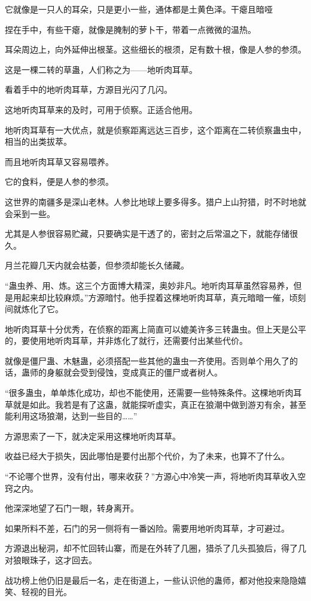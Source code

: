 \begin{this_body}
它就像是一只人的耳朵，只是更小一些，通体都是土黄色泽。干瘪且暗哑

捏在手中，有些干瘪，就像是腌制的萝卜干，带着一点微微的温热。

耳朵周边上，向外延伸出根茎。这些细长的根须，足有数十根，像是人参的参须。

这是一棵二转的草蛊，人们称之为——地听肉耳草。

看着手中的地听肉耳草，方源目光闪了几闪。

这地听肉耳草来的及时，可用于侦察。正适合他用。

地听肉耳草有一大优点，就是侦察距离远达三百步，这个距离在二转侦察蛊虫中，相当的出类拔萃。

而且地听肉耳草又容易喂养。

它的食料，便是人参的参须。

这世界的南疆多是深山老林。人参比地球上要多得多。猎户上山狩猎，时不时地就会采到一些。

尤其是人参很容易贮藏，只要确实是干透了的，密封之后常温之下，就能存储很久。

月兰花瓣几天内就会枯萎，但参须却能长久储藏。

“蛊虫养、用、炼。这三个方面博大精深，奥妙非凡。地听肉耳草虽然容易养，但是用起来却比较麻烦。”方源暗忖。他手捏着这棵地听肉耳草，真元暗暗一催，顷刻间就炼化了它。

地听肉耳草十分优秀，在侦察的距离上简直可以媲美许多三转蛊虫。但上天是公平的，要使用地听肉耳草，并非炼化了就行，还需要付出某些代价。

就像是僵尸蛊、木魅蛊，必须搭配一些其他的蛊虫一齐使用。否则单个用久了的话，蛊师的身躯就会受到侵蚀，变成真正的僵尸或者树人。

“很多蛊虫，单单炼化成功，却也不能使用，还需要一些特殊条件。这棵地听肉耳草就是如此。我若是有了这蛊，就能探听虚实，真正在狼潮中做到游刃有余，甚至能利用这场狼潮，达到一些目的……”

方源思索了一下，就决定采用这棵地听肉耳草。

收益已经大于损失，因此哪怕是要付出那个代价，为了未来，也算不了什么。

“不论哪个世界，没有付出，哪来收获？”方源心中冷笑一声，将地听肉耳草收入空窍之内。

他深深地望了石门一眼，转身离开。

如果所料不差，石门的另一侧将有一番凶险。需要用地听肉耳草，才可避过。

方源退出秘洞，却不忙回转山寨，而是在外转了几圈，猎杀了几头孤狼后，得了几对狼眼珠子，这才回去。

战功榜上他仍旧是最后一名，走在街道上，一些认识他的蛊师，都对他投来隐隐嬉笑、轻视的目光。


\end{this_body}
